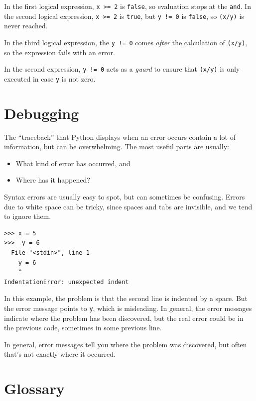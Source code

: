 In the first logical expression, \texttt{x\ >=\ 2} is \texttt{false}, so evaluation stops at the \texttt{and}. In the second logical expression, \texttt{x\ >=\ 2} is \texttt{true}, but \texttt{y\ !=\ 0} is \texttt{false}, so \texttt{(x/y)} is never reached.

In the third logical expression, the \texttt{y\ !=\ 0} comes \emph{after} the calculation of \texttt{(x/y)}, so the expression fails with an error.

In the second expression, \texttt{y\ !=\ 0} acts as a \emph{guard} to ensure that \texttt{(x/y)} is only executed in case \texttt{y} is not zero.

\hypertarget{depuraciuxf3n}{%
\section{Debugging}\label{depuraciuxf3n}}

 

The ``traceback'' that Python displays when an error occurs contain a lot of information, but can be overwhelming. The most useful parts are usually:
\begin{itemize}
\item
  What kind of error has occurred, and
\item
  Where has it happened?
\end{itemize}

Syntax errors are usually easy to spot, but can sometimes be confusing. Errors due to white space can be tricky, since spaces and tabs are invisible, and we tend to ignore them.


\begin{Verbatim}[frame=single]
>>> x = 5
>>>  y = 6
  File "<stdin>", line 1
    y = 6
    ^
IndentationError: unexpected indent
\end{Verbatim}

In this example, the problem is that the second line is indented by a space. But the error message points to \texttt{y}, which is misleading. In general, the error messages indicate where the problem has been discovered, but the real error could be in the previous code, sometimes in some previous line.

In general, error messages tell you where the problem was discovered, but often that's not exactly where it occurred.

\hypertarget{glosario_conditionals}{%
\section{Glossary}\label{glosario_conditionals}}

